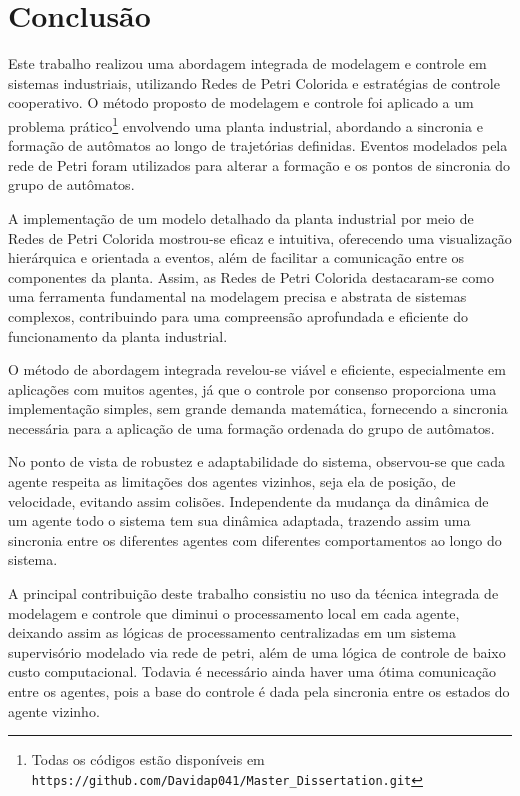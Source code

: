 \chapter{Conclusão}
\label{chap:conclusion}
Este trabalho realizou uma abordagem integrada de modelagem e controle em sistemas industriais, utilizando Redes de Petri Colorida e estratégias de controle cooperativo. 
O método proposto de modelagem e controle foi aplicado a um problema prático\footnote{Todas os códigos estão disponíveis em \texttt{https://github.com/Davidap041/Master\_Dissertation.git}} envolvendo uma planta industrial, abordando a sincronia e formação de autômatos ao longo de trajetórias definidas. Eventos modelados pela rede de Petri foram utilizados para alterar a formação e os pontos de sincronia do grupo de autômatos. 

A implementação de um modelo detalhado da planta industrial por meio de Redes de Petri Colorida mostrou-se eficaz e intuitiva, oferecendo uma visualização hierárquica e orientada a eventos, além de facilitar a comunicação entre os componentes da planta. Assim, as Redes de Petri Colorida destacaram-se como uma ferramenta fundamental na modelagem precisa e abstrata de sistemas complexos, contribuindo para uma compreensão aprofundada e eficiente do funcionamento da planta industrial. 

O método de abordagem integrada revelou-se viável e eficiente, especialmente em aplicações com muitos agentes, já que o controle por consenso proporciona uma implementação simples, sem grande demanda matemática, fornecendo a sincronia necessária para a aplicação de uma formação ordenada do grupo de autômatos. 

No ponto de vista de robustez e adaptabilidade do sistema, observou-se que cada agente respeita as limitações dos agentes vizinhos, seja ela de posição, de velocidade, evitando assim colisões. Independente da mudança da dinâmica de um agente todo o sistema tem sua dinâmica adaptada, trazendo assim uma sincronia entre os diferentes agentes com diferentes comportamentos ao longo do sistema.

A principal contribuição  deste trabalho consistiu no uso da técnica integrada de modelagem e controle que diminui o processamento local em cada agente, deixando assim as lógicas de processamento centralizadas em um sistema supervisório modelado via rede de petri, além de uma lógica de controle de baixo custo computacional. Todavia é necessário ainda haver uma ótima comunicação entre os agentes, pois a base do controle é dada pela sincronia entre os estados do agente vizinho.
